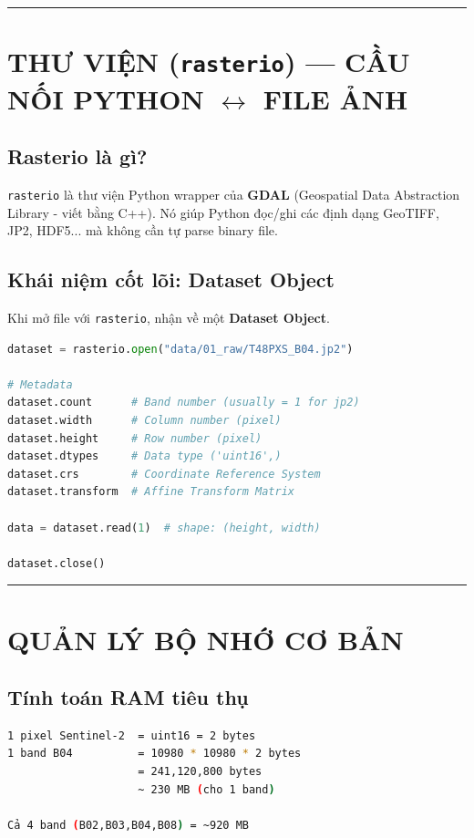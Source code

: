 \documentclass[12pt,a4paper]{report}
\begin{document}
\noindent\rule{\textwidth}{0.4pt}

\section{THƯ VIỆN (\texttt{rasterio}) — CẦU NỐI PYTHON \(\leftrightarrow\) FILE ẢNH}

\subsection{Rasterio là gì?}
\texttt{rasterio} là thư viện Python wrapper của \textbf{GDAL} (Geospatial Data Abstraction Library - viết bằng C++). Nó giúp Python đọc/ghi các định dạng GeoTIFF, JP2, HDF5... mà không cần tự parse binary file.

\subsection{Khái niệm cốt lõi: Dataset Object}
Khi mở file với \texttt{rasterio}, nhận về một \textbf{Dataset Object}.

\begin{lstlisting}[language=python]
dataset = rasterio.open("data/01_raw/T48PXS_B04.jp2")

# Metadata
dataset.count      # Band number (usually = 1 for jp2)
dataset.width      # Column number (pixel)
dataset.height     # Row number (pixel)
dataset.dtypes     # Data type ('uint16',)
dataset.crs        # Coordinate Reference System
dataset.transform  # Affine Transform Matrix

data = dataset.read(1)  # shape: (height, width)

dataset.close()
\end{lstlisting}

\noindent\rule{\textwidth}{0.4pt}

\section{QUẢN LÝ BỘ NHỚ CƠ BẢN}

\subsection{Tính toán RAM tiêu thụ}
\begin{lstlisting}[language=bash, numbers=none]
1 pixel Sentinel-2  = uint16 = 2 bytes
1 band B04          = 10980 * 10980 * 2 bytes
                    = 241,120,800 bytes
                    ~ 230 MB (cho 1 band)

Cả 4 band (B02,B03,B04,B08) = ~920 MB
\end{lstlisting}
\end{document}
